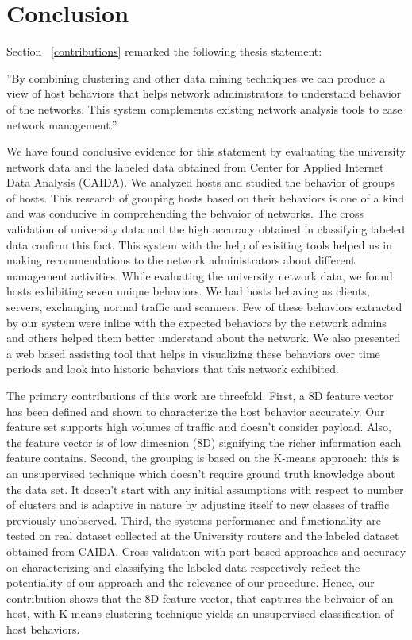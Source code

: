 
\chapter{Conclusion} \label{chap:conclusion}

Section ~\ref{contributions} remarked the following thesis statement:

''By combining clustering and other data mining techniques we can produce a view of host behaviors that helps network administrators to understand behavior of the networks. This system complements existing network analysis tools to ease network management.''

We have found conclusive evidence for this statement by evaluating the university network data and the labeled data obtained from Center for Applied Internet Data Analysis (CAIDA). We analyzed hosts and studied the behavior of groups of hosts. This research of grouping hosts based on their behaviors is one of a kind and was conducive in comprehending the behvaior of networks. The cross validation of university data and the high accuracy obtained in classifying labeled data confirm this fact. This system with the help of exisiting tools helped us in making recommendations to the network administrators about different management activities. While evaluating the university network data, we found hosts exhibiting seven unique behaviors. We had hosts behaving as clients, servers, exchanging normal traffic and scanners. Few of these behaviors extracted by our system were inline with the expected behaviors by the network admins and others helped them better understand about the network. We also presented a web based assisting tool that helps in visualizing these behaviors over time periods and look into historic behaviors that this network exhibited.

The primary contributions of this work are threefold. First, a 8D feature vector has been defined and shown to characterize the host behavior accurately. Our feature set supports high volumes of traffic and doesn't consider payload. Also, the feature vector is of low dimesnion (8D) signifying the richer information each feature contains.
Second, the grouping is based on the K-means approach: this is an unsupervised technique which doesn't require ground truth knowledge about the data set. It dosen't start with any initial assumptions with respect to number of clusters and is adaptive in nature by adjusting itself to new classes of traffic previously unobserved. Third, the systems performance and functionality are tested on real dataset collected at the University routers and the labeled dataset obtained from CAIDA. Cross validation with port based approaches and accuracy on characterizing and classifying the labeled data respectively reflect the potentiality of our approach and the relevance of our procedure.
Hence, our contribution shows that the 8D feature vector, that captures the behvaior of an host, with K-means clustering technique
yields an unsupervised classification of host behaviors.

